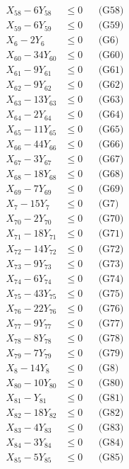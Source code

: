 \documentclass[a4paper,10pt]{article}
\begin{document}
{\begin{align}
X_{58} - 6Y_{58} &\leq 0 && \text{(G58)} \\
X_{59} - 6Y_{59} &\leq 0 && \text{(G59)} \\
X_{6} - 2Y_{6} &\leq 0 && \text{(G6)} \\
X_{60} - 34Y_{60} &\leq 0 && \text{(G60)} \\
X_{61} - 9Y_{61} &\leq 0 && \text{(G61)} \\
X_{62} - 9Y_{62} &\leq 0 && \text{(G62)} \\
X_{63} - 13Y_{63} &\leq 0 && \text{(G63)} \\
X_{64} - 2Y_{64} &\leq 0 && \text{(G64)} \\
X_{65} - 11Y_{65} &\leq 0 && \text{(G65)} \\
X_{66} - 44Y_{66} &\leq 0 && \text{(G66)} \\
\allowbreak
X_{67} - 3Y_{67} &\leq 0 && \text{(G67)} \\
X_{68} - 18Y_{68} &\leq 0 && \text{(G68)} \\
X_{69} - 7Y_{69} &\leq 0 && \text{(G69)} \\
X_{7} - 15Y_{7} &\leq 0 && \text{(G7)} \\
X_{70} - 2Y_{70} &\leq 0 && \text{(G70)} \\
X_{71} - 18Y_{71} &\leq 0 && \text{(G71)} \\
X_{72} - 14Y_{72} &\leq 0 && \text{(G72)} \\
X_{73} - 9Y_{73} &\leq 0 && \text{(G73)} \\
X_{74} - 6Y_{74} &\leq 0 && \text{(G74)} \\
X_{75} - 43Y_{75} &\leq 0 && \text{(G75)} \\
X_{76} - 22Y_{76} &\leq 0 && \text{(G76)} \\
X_{77} - 9Y_{77} &\leq 0 && \text{(G77)} \\
X_{78} - 8Y_{78} &\leq 0 && \text{(G78)} \\
X_{79} - 7Y_{79} &\leq 0 && \text{(G79)} \\
X_{8} - 14Y_{8} &\leq 0 && \text{(G8)} \\
X_{80} - 10Y_{80} &\leq 0 && \text{(G80)} \\
X_{81} - Y_{81} &\leq 0 && \text{(G81)} \\
X_{82} - 18Y_{82} &\leq 0 && \text{(G82)} \\
X_{83} - 4Y_{83} &\leq 0 && \text{(G83)} \\
X_{84} - 3Y_{84} &\leq 0 && \text{(G84)} \\
\allowbreak
X_{85} - 5Y_{85} &\leq 0 && \text{(G85)} \\

\end{align}}
\end{document}
